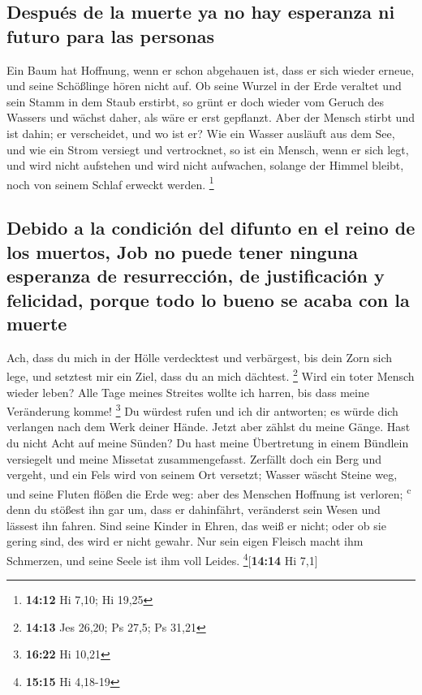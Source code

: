 \hypertarget{despuuxe9s-de-la-muerte-ya-no-hay-esperanza-ni-futuro-para-las-personas}{%
\subsection{Después de la muerte ya no hay esperanza ni futuro para las
personas}\label{despuuxe9s-de-la-muerte-ya-no-hay-esperanza-ni-futuro-para-las-personas}}

 Ein Baum hat Hoffnung, wenn er schon abgehauen ist, dass
er sich wieder erneue, und seine Schößlinge hören nicht auf.
 Ob seine Wurzel in der Erde veraltet und sein Stamm in
dem Staub erstirbt,  so grünt er doch wieder vom Geruch
des Wassers und wächst daher, als wäre er erst gepflanzt.
 Aber der Mensch stirbt und ist dahin; er verscheidet,
und wo ist er?  Wie ein Wasser ausläuft aus dem See, und
wie ein Strom versiegt und vertrocknet,  so ist ein
Mensch, wenn er sich legt, und wird nicht aufstehen und wird nicht
aufwachen, solange der Himmel bleibt, noch von seinem Schlaf erweckt
werden. \footnote{\textbf{14:12} Hi 7,10; Hi 19,25}

\hypertarget{debido-a-la-condiciuxf3n-del-difunto-en-el-reino-de-los-muertos-job-no-puede-tener-ninguna-esperanza-de-resurrecciuxf3n-de-justificaciuxf3n-y-felicidad-porque-todo-lo-bueno-se-acaba-con-la-muerte}{%
\subsection{Debido a la condición del difunto en el reino de los
muertos, Job no puede tener ninguna esperanza de resurrección, de
justificación y felicidad, porque todo lo bueno se acaba con la
muerte}\label{debido-a-la-condiciuxf3n-del-difunto-en-el-reino-de-los-muertos-job-no-puede-tener-ninguna-esperanza-de-resurrecciuxf3n-de-justificaciuxf3n-y-felicidad-porque-todo-lo-bueno-se-acaba-con-la-muerte}}

 Ach, dass du mich in der Hölle verdecktest und
verbärgest, bis dein Zorn sich lege, und setztest mir ein Ziel, dass du
an mich dächtest. \footnote{\textbf{14:13} Jes 26,20; Ps 27,5; Ps 31,21}
 Wird ein toter Mensch wieder leben? Alle Tage meines
Streites wollte ich harren, bis dass meine Veränderung komme!
\footnote{\textbf{16:22} Hi 10,21}  Du würdest rufen und
ich dir antworten; es würde dich verlangen nach dem Werk deiner Hände.
 Jetzt aber zählst du meine Gänge. Hast du nicht Acht auf
meine Sünden?  Du hast meine Übertretung in einem
Bündlein versiegelt und meine Missetat zusammengefasst. 
Zerfällt doch ein Berg und vergeht, und ein Fels wird von seinem Ort
versetzt;  Wasser wäscht Steine weg, und seine Fluten
flößen die Erde weg: aber des Menschen Hoffnung ist verloren;
\textsuperscript{c}  denn du stößest ihn gar um, dass er
dahinfährt, veränderst sein Wesen und lässest ihn fahren.
 Sind seine Kinder in Ehren, das weiß er nicht; oder ob
sie gering sind, des wird er nicht gewahr.  Nur sein
eigen Fleisch macht ihm Schmerzen, und seine Seele ist ihm voll Leides.
\footnote{\textbf{15:15} Hi 4,18-19}{[}\textbf{14:14} Hi 7,1{]}

